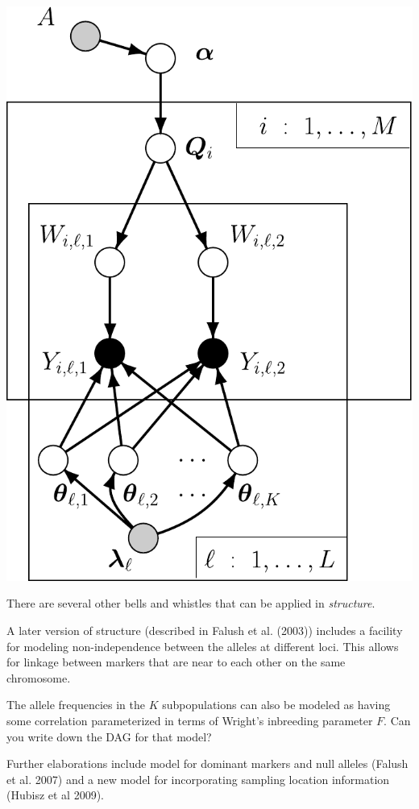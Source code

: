 \hfill
\begin{minipage}{.485\textwidth}
\vfill
\hfill\includegraphics*[width=.95\textwidth]{illus/PritchSimple.pdf}
\vfill
\end{minipage}


There are several other bells and whistles that can be applied in {\sl structure}. 
 
A later version of structure (described in Falush et al. (2003)) includes a facility for modeling non-independence between the alleles at different loci.  This allows for linkage between markers that are near to each other on the same chromosome.

The allele frequencies in the $K$ subpopulations can also be modeled as having some correlation parameterized in terms of Wright's inbreeding parameter $F$.  Can you write down the DAG for that model?

Further elaborations include model for dominant markers and null alleles (Falush et al. 2007) and a new model for incorporating sampling location information (Hubisz et al 2009).

